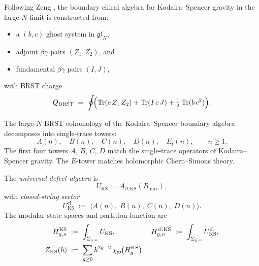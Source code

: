 \begin{definition}
\label{def:zeng-boundary-algebra}
Following Zeng \cite{Zeng23}, the boundary chiral algebra for Kodaira--Spencer gravity
in the large-$N$ limit is constructed from:
\begin{itemize}
\item a $(b,c)$ ghost system in $\mathfrak{gl}_N$,
\item adjoint $\beta\gamma$ pairs $(Z_1,Z_2)$, and
\item fundamental $\beta\gamma$ pairs $(I,J)$,
\end{itemize}
with BRST charge
\begin{equation}
\label{eq:ks-brst}
Q_{\mathrm{BRST}}
\;=\;
\oint\!\Bigl(\operatorname{Tr}(c\,Z_1\,Z_2) + \operatorname{Tr}(I\,c\,J) + \tfrac{1}{2}\operatorname{Tr}(b\,c^2)\Bigr).
\end{equation}
\end{definition}

\begin{proposition}
\label{prop:ks-single-trace}
The large-$N$ BRST cohomology of the Kodaira--Spencer boundary algebra decomposes into
single-trace towers:
\[
A(n),\quad B(n),\quad C(n),\quad D(n),\quad E_t(n),
\qquad n \geq 1.
\]
The first four towers $A$, $B$, $C$, $D$ match the single-trace operators of
Kodaira--Spencer gravity. The $E$-tower matches holomorphic Chern--Simons theory.
\end{proposition}

\begin{definition}
\label{def:universal-defect-algebra-ks}
The \emph{universal defect algebra} is
\begin{equation}
\label{eq:universal-defect-ks}
U_{\mathrm{KS}} := A_{\partial,\mathrm{KS}}(B_{\mathrm{univ}}),
\end{equation}
with \emph{closed-string sector}
\[
U_{\mathrm{KS}}^{\mathrm{cl}}
\;:=\;
\bigl\langle A(n),\;B(n),\;C(n),\;D(n) \bigr\rangle.
\]
The modular state spaces and partition function are
\begin{align}
\label{eq:ks-state-spaces}
H_{g,n}^{\mathrm{KS}}
&\;:=\;
\int_{\Sigma_{g,n}} U_{\mathrm{KS}},
&
H_{g,n}^{\mathrm{cl,KS}}
&\;:=\;
\int_{\Sigma_{g,n}} U_{\mathrm{KS}}^{\mathrm{cl}},
\\
\label{eq:ks-partition-function}
Z_{\mathrm{KS}}(\hbar)
&\;:=\;
\sum_{g \geq 0} \hbar^{2g-2}\,\chi_{\operatorname{gr}}\!\bigl(H_g^{\mathrm{KS}}\bigr).
\end{align}
\end{definition}

